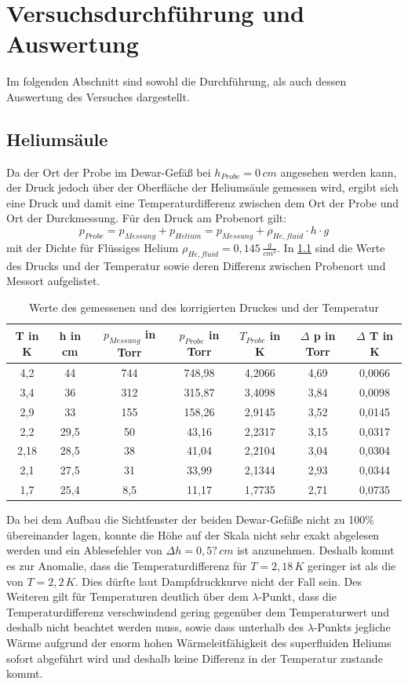 \documentclass[twoside,colorback,accentcolor=tud4c,11pt]{tudreport}
\begin{document}
\chapter{Versuchsdurchführung und Auswertung}
Im folgenden Abschnitt sind sowohl die Durchführung, als auch dessen Auswertung des Versuches dargestellt.
\section{Heliumsäule}
Da der Ort der Probe im Dewar-Gefäß bei $h_{Probe}=0\,\si{cm}$ angesehen werden kann, der Druck jedoch über der Oberfläche der Heliumsäule gemessen wird, ergibt sich eine Druck und damit eine Temperaturdifferenz zwischen dem Ort der Probe und Ort der Durckmessung. Für den Druck am Probenort gilt:
\begin{equation}
p_{Probe}=p_{Messung}+p_{Helium}=p_{Messung}+\rho_{He,fluid}\cdot h \cdot g
\end{equation}
mit der Dichte für Flüssiges Helium $\rho_{He,fluid}=0,145\,\si{\frac{g}{cm^3}}$. In \ref{ptkorr} sind die Werte des Drucks und der Temperatur sowie deren Differenz zwischen Probenort und Messort aufgelistet.
\begin{table}[H]
\centering
\begin{tabular}{|c|c|c|c|c|c|c|}
\hline 
T in K & h in cm & $p_{Messung}$ in Torr & $p_{Probe}$ in Torr & $T_{Probe}$ in K & $\Delta$ p in Torr & $\Delta$ T in K\\ 
\hline 
4,2 & 44 & 744 & 748,98 & 4,2066 & 4,69 & 0,0066 \\ 
\hline 
3,4 & 36 & 312 & 315,87 & 3,4098 & 3,84 & 0,0098 \\ 
\hline 
2,9 & 33 & 155 & 158,26 & 2,9145 & 3,52 & 0,0145 \\ 
\hline 
2,2 & 29,5 & 50 & 43,16 & 2,2317 & 3,15 & 0,0317 \\ 
\hline 
2,18 & 28,5 & 38 & 41,04 & 2,2104 & 3,04 & 0,0304 \\ 
\hline 
2,1 & 27,5 & 31 & 33,99 & 2,1344 & 2,93 & 0,0344 \\ 
\hline 
1,7 & 25,4 & 8,5 & 11,17 & 1,7735 & 2,71 & 0,0735 \\ 
\hline 
\end{tabular}
\caption{Werte des gemessenen und des korrigierten Druckes und der Temperatur}\label{ptkorr}
\end{table} 
Da bei dem Aufbau die Sichtfenster der beiden Dewar-Gefäße nicht zu 100\% übereinander lagen, konnte die Höhe auf der Skala nicht sehr exakt abgelesen werden und ein Ablesefehler von $\Delta h=0,5?\,\si{cm}$ ist anzunehmen. Deshalb kommt es zur Anomalie, dass die Temperaturdifferenz für $T=2,18\,\si{K}$ geringer ist als die von $T=2,2\,\si{K}$. Dies dürfte laut Dampfdruckkurve nicht der Fall sein. Des Weiteren gilt für Temperaturen deutlich über dem $\lambda$-Punkt, dass die Temperaturdifferenz verschwindend gering gegenüber dem Temperaturwert und deshalb nicht beachtet werden muss, sowie dass unterhalb des $\lambda$-Punkts jegliche Wärme aufgrund der enorm hohen Wärmeleitfähigkeit des superfluiden Heliums sofort abgeführt wird und deshalb keine Differenz in der Temperatur zustande kommt.
\end{document}
